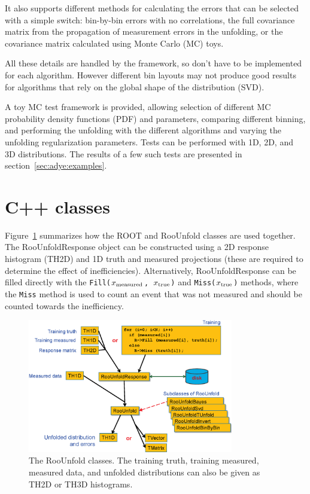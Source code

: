 \documentclass{cernrep}
\begin{document}
It also supports different methods for calculating the errors that can
be selected with a simple switch: bin-by-bin errors with no correlations,
the full covariance matrix from the propagation of measurement errors in the unfolding, or
the covariance matrix calculated using Monte Carlo (MC) toys.

All these details are handled by the framework, so don't have to be
implemented for each algorithm. However different bin layouts may not produce good results for
algorithms that rely on the global shape of the distribution (SVD).

A toy MC test framework is provided, allowing
selection of different MC probability density functions (PDF) and parameters,
comparing different binning, and performing the unfolding with the different
algorithms and varying the unfolding regularization parameters.
Tests can be performed with 1D, 2D, and 3D distributions.
The results of a few such tests are presented in section~\ref{sec:adye:examples}.



\section{C++ classes}

Figure~\ref{Fig:adye:classes} summarizes how the ROOT and RooUnfold classes are used
together. The RooUnfoldResponse object can be constructed using a 2D response histogram (TH2D)
and 1D truth and measured projections (these are required to determine the effect of inefficiencies).
Alternatively, RooUnfoldResponse can be filled directly with the
\texttt{Fill($x_{\rm measured}$, $x_{\rm true}$)}
and
\texttt{Miss($x_{\rm true}$)}
methods, where the \texttt{Miss} method is used to count an event that was not measured
and should be counted towards the inefficiency.%
\begin{figure}
\centerline{\includegraphics[width=0.8\textwidth]{phystat2011_adye_classes.eps}}
\caption{The RooUnfold classes. The training truth, training measured, measured data, and unfolded distributions
can also be given as TH2D or TH3D histograms.}\label{Fig:adye:classes}
\end{figure}
\end{document}

